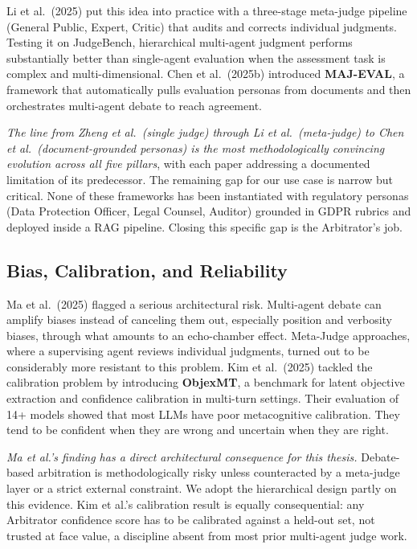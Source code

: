 \documentclass[12pt,a4paper]{report}
\begin{document}
Li et al.\ (2025) put this idea into practice with a three-stage meta-judge pipeline (General Public, Expert, Critic) that audits and corrects individual judgments. Testing it on JudgeBench, hierarchical multi-agent judgment performs substantially better than single-agent evaluation when the assessment task is complex and multi-dimensional. Chen et al.\ (2025b) introduced \textbf{MAJ-EVAL}, a framework that automatically pulls evaluation personas from documents and then orchestrates multi-agent debate to reach agreement.

\begin{critbox}
\textit{The line from Zheng et al.\ (single judge) through Li et al.\ (meta-judge) to Chen et al.\ (document-grounded personas) is the most methodologically convincing evolution across all five pillars}, with each paper addressing a documented limitation of its predecessor. The remaining gap for our use case is narrow but critical. None of these frameworks has been instantiated with regulatory personas (Data Protection Officer, Legal Counsel, Auditor) grounded in GDPR rubrics and deployed inside a RAG pipeline. Closing this specific gap is the Arbitrator's job.
\end{critbox}

\subsection{Bias, Calibration, and Reliability}

Ma et al.\ (2025) flagged a serious architectural risk. Multi-agent debate can amplify biases instead of canceling them out, especially position and verbosity biases, through what amounts to an echo-chamber effect. Meta-Judge approaches, where a supervising agent reviews individual judgments, turned out to be considerably more resistant to this problem. Kim et al.\ (2025) tackled the calibration problem by introducing \textbf{ObjexMT}, a benchmark for latent objective extraction and confidence calibration in multi-turn settings. Their evaluation of 14+ models showed that most LLMs have poor metacognitive calibration. They tend to be confident when they are wrong and uncertain when they are right.

\begin{critbox}
\textit{Ma et al.'s finding has a direct architectural consequence for this thesis.} Debate-based arbitration is methodologically risky unless counteracted by a meta-judge layer or a strict external constraint. We adopt the hierarchical design partly on this evidence. Kim et al.'s calibration result is equally consequential: any Arbitrator confidence score has to be calibrated against a held-out set, not trusted at face value, a discipline absent from most prior multi-agent judge work.
\end{critbox}
\end{document}

